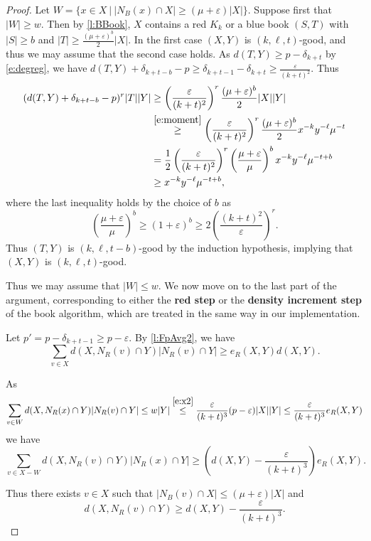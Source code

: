 \documentclass[reqno,final,12pt]{amsart}
\newcommand{\eps}{\varepsilon}
\newcommand{\fs}[2]{\left(\frac{#1}{#2}\right)}
\newcommand{\s}[1]{\left(#1\right)}
\begin{document}
\begin{proof}
Let  $W =\{ x \in X \: | \:  |N_B(x) \cap X| \geq (\mu + \eps)|X|\}$. Suppose first that $|W| \geq w$. Then by \cref{l:BBook}, $X$ contains a red $K_k$ or a blue book $(S,T)$ with $|S| \geq b$ and $|T| \geq  \frac{ (\mu + \eps)^b}{2}|X|$. In the first case $(X,Y)$ is $(k,\ell,t)$-good, and thus we may assume that the second case holds. 
As $d(T,Y) \geq p-\delta_{k+t}$ by \eqref{e:degreg}, we have $d(T,Y) + \delta_{k+t-b} -p \geq \delta_{k+t-1}-\delta_{k+t} \geq \frac{\eps}{(k+t)^2}.$
Thus \begin{align*} 
(d(T,Y) + \delta_{k+t-b} - p)^r |T||Y| &\geq \fs{\eps }{(k+t)^2}^r \frac{(\mu + \eps)^b}{2}|X||Y| \\ &\stackrel{\eqref{e:moment}}{\geq}  \fs{\eps }{(k+t)^2}^r\frac{(\mu + \eps)^b}{2}x^{-k}y^{-\ell}\mu^{-t } \\& = \frac{1}{2}\fs{\eps}{(k+t)^2}^r\fs{\mu + \eps}{\mu}^b x^{-k}y^{-\ell}\mu^{-t+b} \\&\geq x^{-k}y^{-\ell}\mu^{-t+b},
\end{align*}
where the last inequality holds by the choice of $b$ as
$$ \fs{\mu + \eps}{\mu}^b \geq (1+\eps)^b \geq 2\fs{(k+t)^{2}}{\eps}^r.$$ 
Thus $(T,Y)$ is $(k,\ell,t-b)$-good by the induction hypothesis, implying that   $(X,Y)$ is $(k,\ell,t)$-good. 

Thus we may assume that $|W| \leq w$. We now move on to the last part of the argument, corresponding to either the \textbf{red step} or the \textbf{density increment step} of the book algorithm, which are treated in the same way in our implementation. 

Let $p'= p-\delta_{k+t-1} \geq p-\eps.$ By \cref{l:FpAvg2}, we have \begin{equation}
\sum_{v\in X}d(X,N_R(v) \cap Y)|N_R(v) \cap Y| \geq e_R(X,Y)d(X,Y).
\end{equation}

As $$\sum_{v\in W}d(X,N_R(x) \cap Y)|N_R(v) \cap Y| \leq w|Y| \stackrel{\eqref{e:x2}}{\leq}\frac{\eps}{(k+t)^3}(p -\eps)|X||Y|  \leq  \frac{\eps}{(k+t)^3} e_R(X,Y)$$
we have  \begin{equation*}
\sum_{v\in X - W}d(X,N_R(v) \cap Y)|N_R(x) \cap Y| \geq \s{d(X,Y)-\frac{\eps}{(k+t)^3}}e_R(X,Y).
\end{equation*}

 
Thus there exists $v\in X$ such that $|N_B(v) \cap X| \leq (\mu+\eps)|X|$ and  \begin{equation}\label{e:alpha}d(X,N_R(v) \cap Y) \geq d(X,Y)-\frac{\eps}{(k+t)^3}.\end{equation}  


\end{proof}
\end{document}
